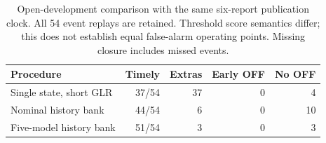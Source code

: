\begin{table}[t]\centering
\caption{Open-development comparison with the same six-report publication clock. All 54 event replays are retained. Threshold score semantics differ; this does not establish equal false-alarm operating points. Missing closure includes missed events.}
\label{tab:single-state-control}
\small\setlength{\tabcolsep}{3pt}
\begin{tabular}{lrrrr}\hline
Procedure & Timely & Extras & Early OFF & No OFF\\\hline
Single state, short GLR & 37/54 & 37 & 0 & 4 \\
Nominal history bank & 44/54 & 6 & 0 & 10 \\
Five-model history bank & 51/54 & 3 & 0 & 3 \\
\hline\end{tabular}
\end{table}
